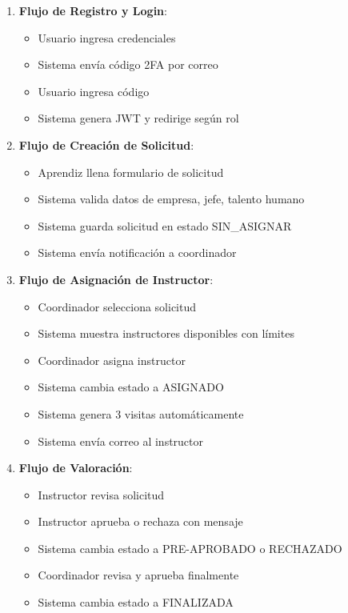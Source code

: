 \begin{enumerate}
    \item \textbf{Flujo de Registro y Login}:
    \begin{itemize}
        \item Usuario ingresa credenciales
        \item Sistema envía código 2FA por correo
        \item Usuario ingresa código
        \item Sistema genera JWT y redirige según rol
    \end{itemize}
    
    \item \textbf{Flujo de Creación de Solicitud}:
    \begin{itemize}
        \item Aprendiz llena formulario de solicitud
        \item Sistema valida datos de empresa, jefe, talento humano
        \item Sistema guarda solicitud en estado SIN\_ASIGNAR
        \item Sistema envía notificación a coordinador
    \end{itemize}
    
    \item \textbf{Flujo de Asignación de Instructor}:
    \begin{itemize}
        \item Coordinador selecciona solicitud
        \item Sistema muestra instructores disponibles con límites
        \item Coordinador asigna instructor
        \item Sistema cambia estado a ASIGNADO
        \item Sistema genera 3 visitas automáticamente
        \item Sistema envía correo al instructor
    \end{itemize}
    
    \item \textbf{Flujo de Valoración}:
    \begin{itemize}
        \item Instructor revisa solicitud
        \item Instructor aprueba o rechaza con mensaje
        \item Sistema cambia estado a PRE-APROBADO o RECHAZADO
        \item Coordinador revisa y aprueba finalmente
        \item Sistema cambia estado a FINALIZADA
    \end{itemize}
\end{enumerate}

